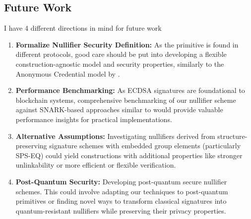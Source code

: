 \subsection{Future Work}
I have 4 different directions in mind for future work
\begin{enumerate}
    \item \textbf{Formalize Nullifier Security Definition:} As the primitive is found in different protocols, good care should be put into developing a flexible construction-agnostic model and security properties, similarly to the Anonymous Credential model by \cite{fuchsbauer_structure-preserving_2019}.

    \item \textbf{Performance Benchmarking:} As ECDSA signatures are foundational to blockchain systems, comprehensive benchmarking of our nullifier scheme against SNARK-based approaches similar to \cite{gupta_plume_2022} would provide valuable performance insights for practical implementations.

    \item \textbf{Alternative Assumptions:} Investigating nullifiers derived from structure-preserving signature schemes with embedded group elements (particularly SPS-EQ) could yield constructions with additional properties like stronger unlinkability or more efficient or flexible verification.

    \item \textbf{Post-Quantum Security:} Developing post-quantum secure nullifier schemes. This could involve adapting our techniques to post-quantum primitives or finding novel ways to transform classical signatures into quantum-resistant nullifiers while preserving their privacy properties.

    
\end{enumerate}















